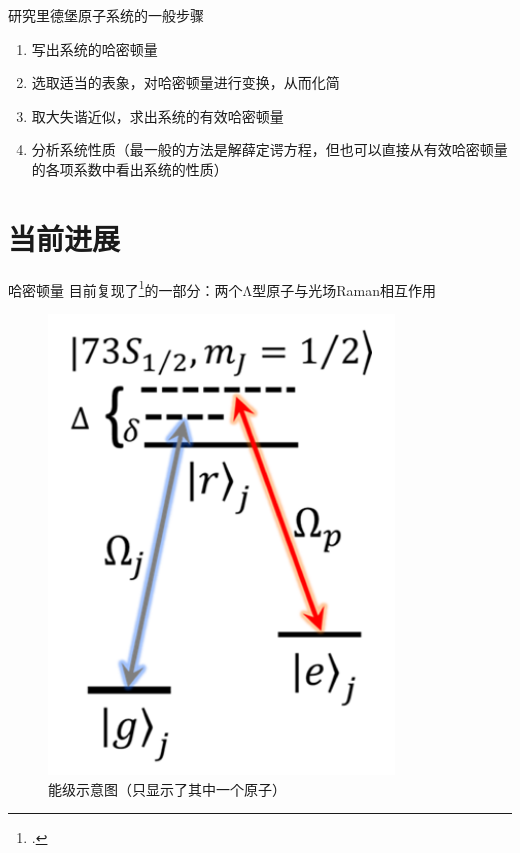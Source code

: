 \documentclass[10pt,aspectratio=43]{beamer}
\begin{document}
\begin{frame}{研究里德堡原子系统的一般步骤}
\begin{enumerate}
\item 写出系统的哈密顿量
\item 选取适当的表象，对哈密顿量进行变换，从而化简
\item 取大失谐近似，求出系统的有效哈密顿量
\item 分析系统性质（最一般的方法是解薛定谔方程，但也可以直接从有效哈密顿量的各项系数中看出系统的性质）
\end{enumerate}
\end{frame}
\section{当前进展}
\begin{frame}{哈密顿量}
目前复现了\footcite{PhysRevA.105.032417}的一部分：两个Λ型原子与光场Raman相互作用
\begin{figure}
\centering
\includegraphics[height=0.5\textheight]{pra-energy-level}
\caption{能级示意图（只显示了其中一个原子）}
\label{fig:pra-energy-level}
\end{figure}
\end{frame}
\end{document}
